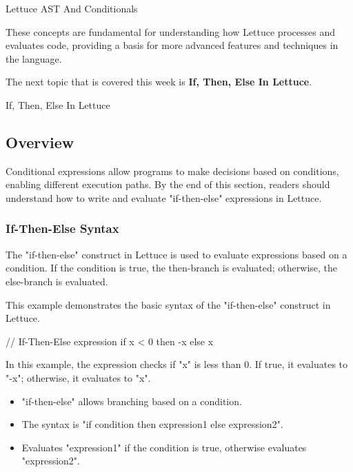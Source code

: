\begin{notes}{Lettuce AST And Conditionals}
\begin{highlight}
        These concepts are fundamental for understanding how Lettuce processes and evaluates code, providing a basis for more advanced features and techniques in the language.
    
    \end{highlight}
\end{notes}

The next topic that is covered this week is \textbf{If, Then, Else In Lettuce}.

\begin{notes}{If, Then, Else In Lettuce}
    \subsection*{Overview}

    Conditional expressions allow programs to make decisions based on conditions, enabling different execution paths. By the end of this section, readers should understand how to write and evaluate 
    "if-then-else" expressions in Lettuce.
    
    \subsubsection*{If-Then-Else Syntax}
    
    The "if-then-else" construct in Lettuce is used to evaluate expressions based on a condition. If the condition is true, the then-branch is evaluated; otherwise, the else-branch is evaluated.
    
    \begin{highlight}
    
        This example demonstrates the basic syntax of the "if-then-else" construct in Lettuce.
    
    \begin{code}[Lettuce]
    // If-Then-Else expression
    if x < 0 then -x else x
    \end{code}
    
        In this example, the expression checks if "x" is less than 0. If true, it evaluates to "-x"; otherwise, it evaluates to "x".
    
        \begin{itemize}
            \item "if-then-else" allows branching based on a condition.
            \item The syntax is "if condition then expression1 else expression2".
            \item Evaluates "expression1" if the condition is true, otherwise evaluates "expression2".
        \end{itemize}
    

\end{highlight}
\end{notes}
